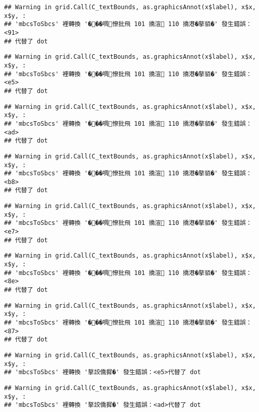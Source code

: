 \documentclass[
]{article}
\begin{document}
\begin{verbatim}
## Warning in grid.Call(C_textBounds, as.graphicsAnnot(x$label), x$x, x$y, :
## 'mbcsToSbcs' 裡轉換 '���啁憭批飛 101 撟渲 110 撟港�摮貊�' 發生錯誤：<91>
## 代替了 dot
\end{verbatim}

\begin{verbatim}
## Warning in grid.Call(C_textBounds, as.graphicsAnnot(x$label), x$x, x$y, :
## 'mbcsToSbcs' 裡轉換 '���啁憭批飛 101 撟渲 110 撟港�摮貊�' 發生錯誤：<e5>
## 代替了 dot
\end{verbatim}

\begin{verbatim}
## Warning in grid.Call(C_textBounds, as.graphicsAnnot(x$label), x$x, x$y, :
## 'mbcsToSbcs' 裡轉換 '���啁憭批飛 101 撟渲 110 撟港�摮貊�' 發生錯誤：<ad>
## 代替了 dot
\end{verbatim}

\begin{verbatim}
## Warning in grid.Call(C_textBounds, as.graphicsAnnot(x$label), x$x, x$y, :
## 'mbcsToSbcs' 裡轉換 '���啁憭批飛 101 撟渲 110 撟港�摮貊�' 發生錯誤：<b8>
## 代替了 dot
\end{verbatim}

\begin{verbatim}
## Warning in grid.Call(C_textBounds, as.graphicsAnnot(x$label), x$x, x$y, :
## 'mbcsToSbcs' 裡轉換 '���啁憭批飛 101 撟渲 110 撟港�摮貊�' 發生錯誤：<e7>
## 代替了 dot
\end{verbatim}

\begin{verbatim}
## Warning in grid.Call(C_textBounds, as.graphicsAnnot(x$label), x$x, x$y, :
## 'mbcsToSbcs' 裡轉換 '���啁憭批飛 101 撟渲 110 撟港�摮貊�' 發生錯誤：<8e>
## 代替了 dot
\end{verbatim}

\begin{verbatim}
## Warning in grid.Call(C_textBounds, as.graphicsAnnot(x$label), x$x, x$y, :
## 'mbcsToSbcs' 裡轉換 '���啁憭批飛 101 撟渲 110 撟港�摮貊�' 發生錯誤：<87>
## 代替了 dot
\end{verbatim}

\begin{verbatim}
## Warning in grid.Call(C_textBounds, as.graphicsAnnot(x$label), x$x, x$y, :
## 'mbcsToSbcs' 裡轉換 '摮詨僑摨�' 發生錯誤：<e5>代替了 dot
\end{verbatim}

\begin{verbatim}
## Warning in grid.Call(C_textBounds, as.graphicsAnnot(x$label), x$x, x$y, :
## 'mbcsToSbcs' 裡轉換 '摮詨僑摨�' 發生錯誤：<ad>代替了 dot
\end{verbatim}
\end{document}
